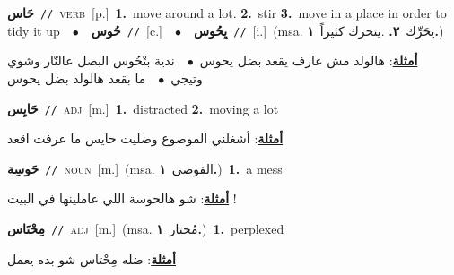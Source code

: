 \documentclass[10pt,a4paper,twoside]{article} %
\begin{document}
\begin{multicols}{2}
{\setlength\topsep{0pt}\textbf{\foreignlanguage{arabic}{حَاس}}\ {\color{gray}\texttt{//}\color{black}}\ \textsc{verb}\ [p.]\ \textbf{1.}~move around a lot.  \textbf{2.}~stir  \textbf{3.}~move in a place in order to tidy it up\ \ $\bullet$\ \ \setlength\topsep{0pt}\textbf{\foreignlanguage{arabic}{حُوس}}\ {\color{gray}\texttt{//}\color{black}}\ [c.]\ \ $\bullet$\ \ \setlength\topsep{0pt}\textbf{\foreignlanguage{arabic}{يِحُوس}}\ {\color{gray}\texttt{//}\color{black}}\ [i.]\ \color{gray}(msa. \foreignlanguage{arabic}{يحَرِّك}~\foreignlanguage{arabic}{\textbf{٢.}}  .\foreignlanguage{arabic}{يتحرك كثيراً}~\foreignlanguage{arabic}{\textbf{١.}})\color{black}\  \begin{flushright}\color{gray}\foreignlanguage{arabic}{\textbf{\underline{\foreignlanguage{arabic}{أمثلة}}}: هالولد مش عارف يقعد بضل يحوس\ $\bullet$\ \  ندية بتْحُوس البصل عالنّار وشوي وتيجي\ $\bullet$\ \  ما بقعد هالولد بضل يحوس}\end{flushright}\color{black}} \vspace{2mm}

{\setlength\topsep{0pt}\textbf{\foreignlanguage{arabic}{حَايِس}}\ {\color{gray}\texttt{//}\color{black}}\ \textsc{adj}\ [m.]\ \textbf{1.}~distracted  \textbf{2.}~moving a lot\  \begin{flushright}\color{gray}\foreignlanguage{arabic}{\textbf{\underline{\foreignlanguage{arabic}{أمثلة}}}: أشغلني الموضوع وضليت حايس ما عرفت اقعد}\end{flushright}\color{black}} \vspace{2mm}

{\setlength\topsep{0pt}\textbf{\foreignlanguage{arabic}{حَوسِة}}\ {\color{gray}\texttt{//}\color{black}}\ \textsc{noun}\ [m.]\ \color{gray}(msa. \foreignlanguage{arabic}{الفوضى}~\foreignlanguage{arabic}{\textbf{١.}})\color{black}\ \textbf{1.}~a mess\  \begin{flushright}\color{gray}\foreignlanguage{arabic}{\textbf{\underline{\foreignlanguage{arabic}{أمثلة}}}: شو هالحوسة اللي عاملينها في البيت !}\end{flushright}\color{black}} \vspace{2mm}

{\setlength\topsep{0pt}\textbf{\foreignlanguage{arabic}{مِحْتَاس}}\ {\color{gray}\texttt{//}\color{black}}\ \textsc{adj}\ [m.]\ \color{gray}(msa. \foreignlanguage{arabic}{مُحتار}~\foreignlanguage{arabic}{\textbf{١.}})\color{black}\ \textbf{1.}~perplexed\  \begin{flushright}\color{gray}\foreignlanguage{arabic}{\textbf{\underline{\foreignlanguage{arabic}{أمثلة}}}: ضله مِحْتاس شو بده يعمل}\end{flushright}\color{black}} \vspace{2mm}


\end{multicols}
\end{document}
